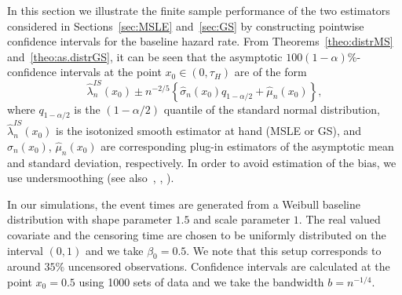 \documentclass[11pt,reqno]{amsart}
\theoremstyle{definition}
\theoremstyle{plain}
\theoremstyle{remark}
\begin{document}
In this section we illustrate the finite sample performance of the two estimators considered
in Sections~\ref{sec:MSLE} and~\ref{sec:GS} by constructing pointwise confidence intervals for the baseline hazard rate.
From Theorems~\ref{theo:distrMS} and~\ref{theo:as.distrGS},
it can be seen that the asymptotic $100(1-\alpha)\%$-confidence intervals at the point $x_0\in(0,\tau_H)$
are of the form
\begin{equation}
\label{def:confint}
\widehat\lambda_n^{IS}(x_0)
\pm n^{-2/5}
\left\{
\widehat{\sigma}_n(x_0)q_{1-\alpha/2}+\widehat{\mu}_n(x_0)
\right\},
\end{equation}
where $q_{1-\alpha/2}$ is the $(1-\alpha/2)$ quantile of the standard normal distribution,
$\widehat\lambda_n^{IS}(x_0)$ is the isotonized smooth estimator at hand (MSLE or GS),
and $\widehat{\sigma}_n(x_0)$, $\widehat{\mu}_n(x_0)$ are corresponding plug-in estimators of the asymptotic mean and standard deviation, respectively.
In order to avoid estimation of the bias, we use undersmoothing (see also~\cite{Hall92}, \cite{GJ15}, \cite{CHT06}).

In our simulations, the event times are generated from a Weibull baseline distribution with shape parameter $1.5$ and scale
parameter $1$.
The real valued covariate and the censoring time are chosen to be uniformly distributed on the interval $(0,1)$ and we take $\beta_0=0.5$.
We note that this setup corresponds to around $35\%$ uncensored observations.
Confidence intervals are calculated at the point $x_0=0.5$ using 1000 sets of data and
we take the bandwidth $b=n^{-1/4}$.
\end{document}
